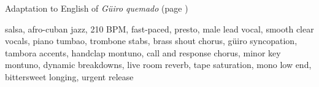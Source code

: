 
\label{sec:memory-wakes}

\begin{notes}
Adaptation to English of \emph{Güiro quemado} (page \pageref{sec:guiro-quemado})
\end{notes}

\begin{style}
salsa, afro-cuban jazz, 210 BPM, fast-paced, presto, male lead vocal, smooth clear vocals, piano tumbao, trombone stabs, brass shout chorus, güiro syncopation, tambora accents, handclap montuno, call and response chorus, minor key montuno, dynamic breakdowns, live room reverb, tape saturation, mono low end, bittersweet longing, urgent release
\end{style}

